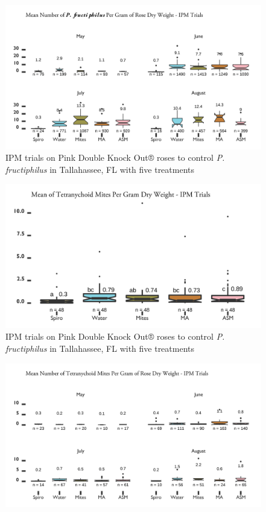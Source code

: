 \documentclass[12pt,final,CPage]{ufthesis}
\begin{document}
{\begin{figure}
  {\centering \includegraphics[width=0.8\linewidth]{figure/rrv_ipm_graph_erios_talla_month} 

  }

  \caption{IPM trials on Pink Double Knock Out® roses to control \textit{P. fructiphilus} in Tallahassee, FL with five treatments}\label{fig:ipm-talla-erios-month}
  \end{figure}
  \begin{figure}

  {\centering \includegraphics[width=0.8\linewidth]{figure/rrv_ipm_graph_tets_talla} 

  }

  \caption{IPM trials on Pink Double Knock Out® roses to control \textit{P. fructiphilus} in Tallahassee, FL with five treatments}\label{fig:ipm-talla-tets}
  \end{figure}
  \begin{figure}

  {\centering \includegraphics[width=0.8\linewidth]{figure/rrv_ipm_graph_tets_talla_month} 

}
\end{figure}}
\end{document}
